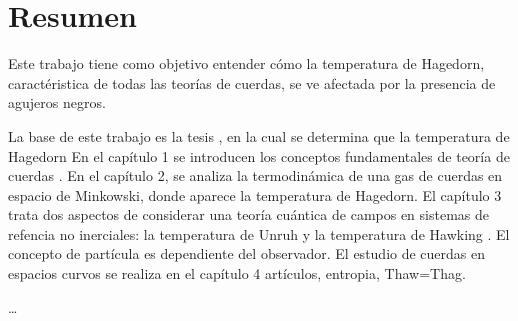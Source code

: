 \chapter*{Resumen}

Este trabajo tiene como objetivo entender cómo la temperatura de Hagedorn, 
caractéristica de todas las teorías de cuerdas, se ve afectada por la presencia de agujeros
negros.

La base de este trabajo es la tesis \cite{Mertens2015}, en la cual se determina que la temperatura
de Hagedorn 
En el capítulo 1 se introducen los conceptos fundamentales de teoría de cuerdas \cite{Tong:2009np}. 
En el capítulo 2, se analiza la termodinámica de una gas de cuerdas en
espacio de Minkowski, donde aparece la temperatura de Hagedorn.
El capítulo 3 trata dos aspectos de considerar una teoría cuántica de campos en 
sistemas de refencia no inerciales: la temperatura de Unruh y la temperatura de Hawking \cite{Barbado:2015uua}.
El concepto de partícula es dependiente del observador.
El estudio de cuerdas en espacios curvos se realiza en el capítulo 4 
\cite{Mertens2015} artículos, entropia, Thaw=Thag. 



\ldots

